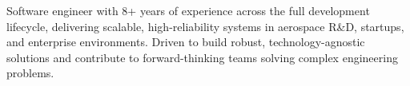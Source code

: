 
\begin{cvparagraph}
Software engineer with 8+ years of experience across the full development lifecycle, delivering scalable, high-reliability systems in aerospace R\&D, startups, and enterprise environments. Driven to build robust, technology-agnostic solutions and contribute to forward-thinking teams solving complex engineering problems.
\end{cvparagraph}
